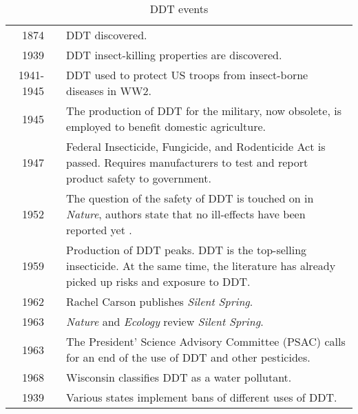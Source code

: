 
\section*{\citet{Maguire2009}}

\begin{table}[H]
	\caption{DDT events}

	\begin{tabularx}{\textwidth}{r @{\hspace{0.5\tabcolsep}} l |@{\timeline} X}
		\toprule

		1874 & & DDT discovered.\\

		1939 & & DDT insect-killing properties are discovered.\\

		1941-1945 & & DDT used to protect US troops from insect-borne diseases in WW2.\\

		1945 & & The production of DDT for the military, now obsolete, is employed to benefit domestic agriculture.\\

		1947 & & Federal Insecticide, Fungicide, and Rodenticide Act is passed. Requires manufacturers to test and report product safety to government.\\

		1952 & & The question of the safety of DDT is touched on in \textit{Nature}, authors state that no ill-effects have been reported yet \citep{Davidson1952}.\\
 
		1959 & & Production of DDT peaks. DDT is the top-selling insecticide. At the same time, the literature has already picked up risks and exposure to DDT.\\

		1962 & & Rachel Carson publishes \textit{Silent Spring}.\\

		1963 & & \textit{Nature} and \textit{Ecology} review \textit{Silent Spring}.\\

		1963 & & The President' Science Advisory Committee (PSAC) calls for an end of the use of DDT and other pesticides.\\

		1968 & & Wisconsin classifies DDT as a water pollutant.\\

		1939 & & Various states implement bans of different uses of DDT.\\


\end{tabularx}
\end{table}
